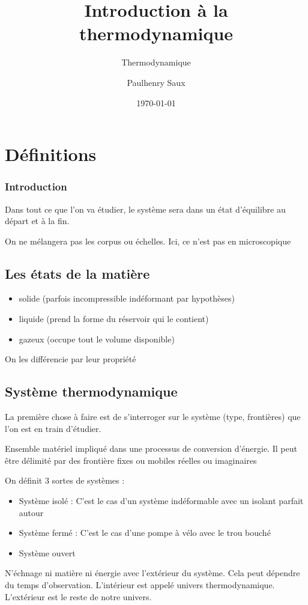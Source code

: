 \documentclass[french]{yLectureNote}
\title{Introduction à la thermodynamique}
\subtitle{Thermodynamique}
\author{Paulhenry Saux}
\date{\today}
\begin{document}
\chapter{Définitions}
\subsection{Introduction}
Dans tout ce que l'on va étudier, le système sera dans un état d'équilibre au départ et à la fin.

On ne mélangera pas les corpus ou échelles. Ici, ce n'est pas en microscopique
\section{Les états de la matière}
\begin{itemize}
    \item solide (parfois incompressible indéformant par hypothèses)
    \item liquide (prend la forme du réservoir qui le contient)
    \item gazeux (occupe tout le volume disponible)
\end{itemize}
On les différencie par leur propriété
\section{Système thermodynamique}
La première chose à faire est de s'interroger sur le système (type, frontières) que l'on est en train d'étudier.
\begin{definition}
    Ensemble matériel impliqué dans une processus de conversion d'énergie. 
    Il peut \^etre délimité par des frontière fixes ou mobiles réelles ou imaginaires
\end{definition}
On définit 3 sortes de systèmes :
\begin{itemize}
    \item Système isolé : C'est le cas d'un système indéformable avec un isolant parfait autour
    \item  Système fermé : C'est le cas d'une pompe à vélo avec le trou bouché
    \item Système ouvert
\end{itemize}
\begin{definition}
    N'échnage ni matière ni énergie avec l'extérieur du système. Cela peut dépendre du temps d'observation. 
    L'intérieur est appelé univers thermodynamique. L'extérieur est le reste de notre univers.
\end{definition}
\end{document}
